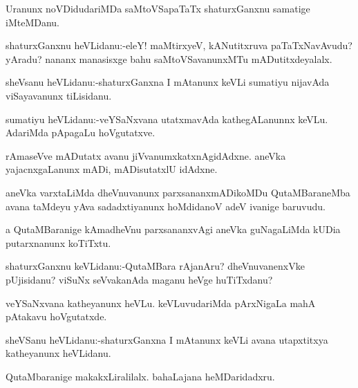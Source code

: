 \documentclass{article}
\begin{document}
\begin{mn}%
Uranunx noVDidudariMDa saMtoVSapaTaTx shaturxGanxnu samatige iMteMDanu.
\end{mn}

\begin{mn}%
shaturxGanxnu heVLidanu:-eleY! maMtirxyeV, kANutitxruva paTaTxNavAvudu? yAradu? nananx 
manasisxge bahu saMtoVSavanunxMTu mADutitxdeyalalx.
\end{mn}

\begin{mn}%
sheVsanu heVLidanu:-shaturxGanxna I mAtanunx keVLi sumatiyu nijavAda viSayavanunx tiLisidanu.
\end{mn}

\begin{mn}%
sumatiyu heVLidanu:-veYSaNxvana utatxmavAda kathegALanunnx keVLu. AdariMda pApagaLu 
hoVgutatxve.
\end{mn}

\begin{mn}%
rAmaseVve  mADutatx avanu jiVvanumxkatxnAgidAdxne. aneVka yajacnxgaLanunx mADi, 
mADisutatxlU idAdxne.
\end{mn}

\begin{mn}%
aneVka varxtaLiMda dheVnuvanunx parxsananxmADikoMDu QutaMBaraneMba avana taMdeyu yAva 
sadadxtiyanunx hoMdidanoV adeV ivanige baruvudu.
\end{mn}

\begin{mn}%
a QutaMBaranige kAmadheVnu parxsananxvAgi aneVka guNagaLiMda kUDia putarxnanunx koTiTxtu.
\end{mn}

\begin{mn}%
shaturxGanxnu keVLidanu:-QutaMBara rAjanAru? dheVnuvanenxVke pUjisidanu? viSuNx 
seVvakanAda maganu heVge huTiTxdanu?
\end{mn}

\begin{mn}%
veYSaNxvana katheyanunx heVLu. keVLuvudariMda pArxNigaLa mahA pAtakavu hoVgutatxde.
\end{mn}

\begin{mn}%
sheVSanu heVLidanu:-shaturxGanxna I mAtanunx keVLi avana utapxtitxya katheyanunx heVLidanu.
\end{mn}

\begin{mn}%
QutaMbaranige makakxLiralilalx. bahaLajana heMDaridadxru.
\end{mn}
\end{document}

